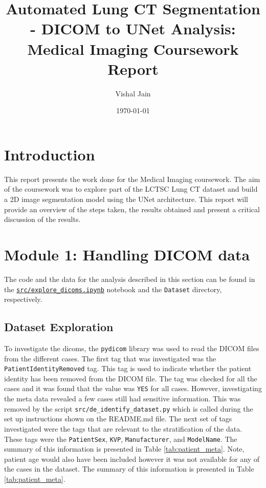 \documentclass[11pt]{article}
\title{Automated Lung CT Segmentation -  DICOM to UNet Analysis: Medical Imaging Coursework Report}
\author{Vishal Jain}
\date{\today}
\begin{document}
\maketitle

\tableofcontents

\newpage

\section{Introduction}
This report presents the work done for the Medical Imaging coursework. The aim of the coursework was to explore part of the LCTSC Lung CT dataset and build a 2D image segmentation model using the UNet architecture. This report will provide an overview of the steps taken, the results obtained and present a critical discussion of the results.

\section{Module 1: Handling DICOM data}
The code and the data for the analysis described in this section can be found in the \texttt{\url{src/explore_dicoms.ipynb}} notebook and the \texttt{Dataset} directory, respectively.

\subsection{Dataset Exploration}
To investigate the dicoms, the \texttt{pydicom} library was used to read the DICOM files from the different cases. The first tag that was investigated was the \texttt{PatientIdentityRemoved} tag. This tag is used to indicate whether the patient identity has been removed from the DICOM file. The tag was checked for all the cases and it was found that the value was \texttt{YES} for all cases. However, investigating the meta data revealed a few cases still had sensitive information. This was removed by the script \texttt{src/de\_identify\_dataset.py} which is called during the set up instructions shown on the README.md file. The next set of tags investigated were the tags that are relevant to the stratification of the data. These tags were the \texttt{PatientSex}, \texttt{KVP}, \texttt{Manufacturer}, and \texttt{ModelName}. The summary of this information is presented in Table \ref{tab:patient_meta}. Note, patient age would also have been included however it was not available for any of the cases in the dataset.
The summary of this information is presented in Table \ref{tab:patient_meta}.
\end{document}
